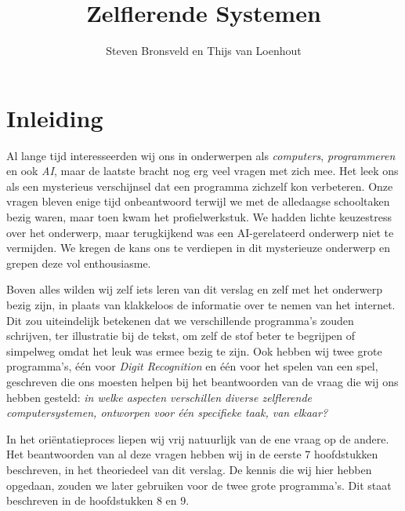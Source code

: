 \documentclass[a4paper,titlepage]{article}
\title{Zelflerende Systemen}
\author{Steven Bronsveld en Thijs van Loenhout}
\begin{document}
\begin{titlepage}

\maketitle
\end{titlepage}

\renewcommand{\contentsname}{Inhoud}

\newpage
\tableofcontents



\newpage

\section{Inleiding}
Al lange tijd interesseerden wij ons in onderwerpen als \textit{computers}, \textit{programmeren} en ook \textit{AI}, maar de laatste bracht nog erg veel vragen met zich mee. Het leek ons als een mysterieus verschijnsel dat een programma zichzelf kon verbeteren. Onze vragen bleven enige tijd onbeantwoord terwijl we met de alledaagse schooltaken bezig waren, maar toen kwam het profielwerkstuk. We hadden lichte keuzestress over het onderwerp, maar terugkijkend was een AI-gerelateerd onderwerp niet te vermijden. We kregen de kans ons te verdiepen in dit mysterieuze onderwerp en grepen deze vol enthousiasme.

Boven alles wilden wij zelf iets leren van dit verslag en zelf met het onderwerp bezig zijn, in plaats van klakkeloos de informatie over te nemen van het internet. Dit zou uiteindelijk betekenen dat we verschillende programma's zouden schrijven, ter illustratie bij de tekst, om zelf de stof beter te begrijpen of simpelweg omdat het leuk was ermee bezig te zijn. Ook hebben wij twee grote programma's, \'e\'en voor \textit{Digit Recognition} en \'e\'en voor het spelen van een spel, geschreven die ons moesten helpen bij het beantwoorden van de vraag die wij ons hebben gesteld: \textit{in welke aspecten verschillen diverse zelflerende computersystemen, ontworpen voor \'e\'en specifieke taak, van elkaar?}

In het ori\"entatieproces liepen wij vrij natuurlijk van de ene vraag op de andere. Het beantwoorden van al deze vragen hebben wij in de eerste 7 hoofdstukken beschreven, in het theoriedeel van dit verslag. De kennis die wij hier hebben opgedaan, zouden we later gebruiken voor de twee grote programma's. Dit staat beschreven in de hoofdstukken 8 en 9.


\newpage

\end{document}
